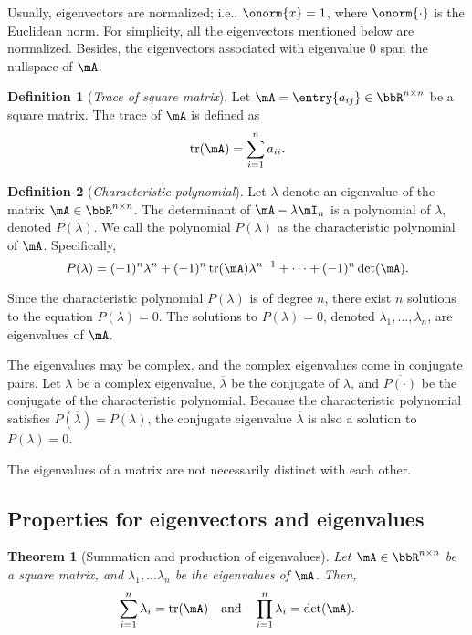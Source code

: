 \documentclass[11pt]{article}
\DeclareMathOperator{\tr}{tr}
\theoremstyle{plain}
\newtheorem{thm}{Theorem}[section]
\theoremstyle{definition}
\newtheorem{defn}{Definition}
\begin{document}
 Usually, eigenvectors are normalized; i.e., $\onorm{x} = 1$, where $\onorm{\cdot}$ is the Euclidean norm. For simplicity, all the eigenvectors mentioned below are normalized. Besides, the eigenvectors associated with eigenvalue 0 span the nullspace of $\mA$.

\begin{defn}[\textit{Trace of square matrix}]\label{def:trace}
Let $\mA = \entry{a_{ij}} \in \bbR^{n \times n}$ be a square matrix. The trace of $\mA$ is defined as
\[ \tr(\mA) = \sum_{i = 1}^n a_{ii}.\] 
\end{defn}

\begin{defn}[\textit{Characteristic polynomial}]\label{def:charac}
	Let $\lambda$ denote an eigenvalue of the matrix $\mA\in \bbR^{n \times n}$.
	The determinant of $\mA - \lambda \mI_n$ is a polynomial of $\lambda$, denoted $P(\lambda)$. We call the polynomial $P(\lambda)$ as the characteristic polynomial of $\mA$. Specifically,
	\begin{equation}\label{def:charapoly}
		 P(\lambda)  = (-1)^n \lambda^n +  (-1)^n  \tr(\mA)\lambda^{n-1} + \cdots + (-1)^n \det(\mA). 
	\end{equation}
\end{defn}

Since the characteristic polynomial $P(\lambda)$ is of degree $n$, there exist $n$ solutions to the equation $P(\lambda) = 0$. The solutions to $P(\lambda) = 0$, denoted $\lambda_1,...,\lambda_n$, are eigenvalues of $\mA$.

\vspace{0.2cm}
The eigenvalues may be complex, and the complex eigenvalues come in conjugate pairs. Let $\lambda$ be a complex eigenvalue, $\overline \lambda$ be the conjugate of $\lambda$, and $\overline{P(\cdot)}$ be the conjugate of the characteristic polynomial. Because the characteristic polynomial satisfies $P(\overline{ \lambda}) = \overline{ P(\lambda)}$, the conjugate eigenvalue $\overline \lambda$ is also a solution to $P(\lambda) = 0$. 

\vspace{0.2cm}
The eigenvalues of a matrix are not necessarily distinct with each other.


\subsection{Properties for eigenvectors and eigenvalues}

\begin{thm}[Summation and production of eigenvalues]\label{thm:speigen}
	Let  $\mA \in \bbR^{n \times n}$ be a square matrix, and $\lambda_1,...\lambda_n$ be the eigenvalues of $\mA$. Then,
	\begin{equation}
		\sum_{i=1}^n \lambda_i = \tr(\mA)\quad \text{and} \quad \prod_{i=1}^n \lambda_i = \det(\mA).
	\end{equation} 
\end{thm}
\end{document}
